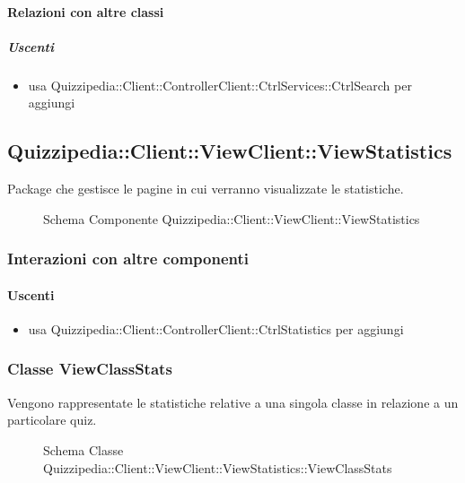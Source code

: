 \paragraph{Relazioni con altre classi}
\subparagraph{Uscenti}
\begin{itemize}
\item usa Quizzipedia::Client::ControllerClient::CtrlServices::CtrlSearch per aggiungi
\end{itemize}
\subsection{Quizzipedia::Client::ViewClient::ViewStatistics}
Package che gestisce le pagine in cui verranno visualizzate le statistiche.
\begin{figure}[H]
\centering
\noindent{}
\caption[Schema Componente Quizzipedia::Client::ViewClient::ViewStatistics]{Schema Componente Quizzipedia::Client::ViewClient::ViewStatistics}
\end{figure}
\subsubsection{Interazioni con altre componenti}
\paragraph{Uscenti}
\begin{itemize}
\item usa Quizzipedia::Client::ControllerClient::CtrlStatistics per aggiungi
\end{itemize}
\subsubsection{Classe ViewClassStats}
Vengono rappresentate le statistiche relative a una singola classe in relazione a un particolare quiz.
\begin{figure}[H]
\centering
\noindent{}
\caption[Schema Classe ViewClassStats]{Schema Classe Quizzipedia::Client::ViewClient::ViewStatistics::ViewClassStats}
\end{figure}
